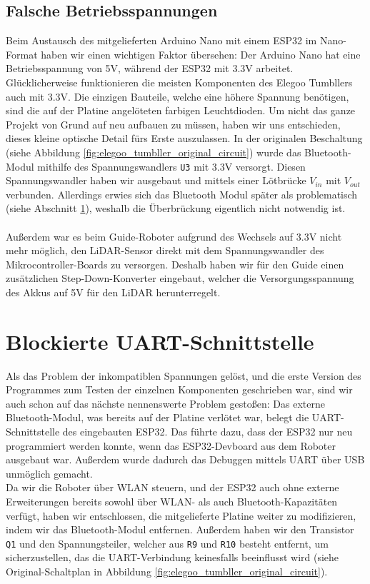 \subsection{Falsche Betriebsspannungen}
\label{subsec:problem_betriebsspannungen}
Beim Austausch des mitgelieferten Arduino Nano mit einem ESP32 im Nano-Format haben wir einen wichtigen Faktor übersehen:
%
Der Arduino Nano hat eine Betriebsspannung von 5V,
während der ESP32 mit 3.3V arbeitet.
%
Glücklicherweise funktionieren die meisten Komponenten des Elegoo Tumbllers auch mit 3.3V.
%
Die einzigen Bauteile,
welche eine höhere Spannung benötigen,
sind die auf der Platine angelöteten farbigen Leuchtdioden.
%
Um nicht das ganze Projekt von Grund auf neu aufbauen zu müssen,
haben wir uns entschieden,
dieses kleine optische Detail fürs Erste auszulassen.
%
In der originalen Beschaltung (siehe Abbildung \ref{fig:elegoo_tumbller_original_circuit})
wurde das Bluetooth-Modul mithilfe des Spannungswandlers \texttt{U3} mit 3.3V versorgt.
%
Diesen Spannungswandler haben wir ausgebaut und mittels einer Lötbrücke $V_{in}$ mit $V_{out}$ verbunden.
Allerdings erwies sich das Bluetooth Modul später als problematisch (siehe Abschnitt \ref{subsec:problem_bluetooth_serial}),
weshalb die Überbrückung eigentlich nicht notwendig ist.
\\\\
Außerdem war es beim Guide-Roboter aufgrund des Wechsels auf 3.3V nicht mehr möglich,
den LiDAR-Sensor direkt mit dem Spannungswandler des Mikrocontroller-Boards zu versorgen.
%
Deshalb haben wir für den Guide einen zusätzlichen Step-Down-Konverter eingebaut,
welcher die Versorgungsspannung des Akkus auf 5V für den LiDAR herunterregelt.
\section{Blockierte UART-Schnittstelle}
\label{subsec:problem_bluetooth_serial}
Als das Problem der inkompatiblen Spannungen gelöst,
und die erste Version des Programmes zum Testen der einzelnen Komponenten geschrieben war,
sind wir auch schon auf das nächste nennenswerte Problem gestoßen:
%
Das externe Bluetooth-Modul,
was bereits auf der Platine verlötet war,
belegt die UART-Schnittstelle des eingebauten ESP32.
%
Das führte dazu, dass der ESP32 nur neu programmiert werden konnte,
wenn das ESP32-Devboard aus dem Roboter ausgebaut war.
%
Außerdem wurde dadurch das Debuggen mittels UART über USB unmöglich gemacht.
\\
Da wir die Roboter über WLAN steuern,
und der ESP32 auch ohne externe Erweiterungen bereits sowohl über WLAN- als auch Bluetooth-Kapazitäten verfügt,
haben wir entschlossen,
die mitgelieferte Platine weiter zu modifizieren,
indem wir das Bluetooth-Modul entfernen.
%
Außerdem haben wir den Transistor \texttt{Q1} und den Spannungsteiler,
welcher aus \texttt{R9} und \texttt{R10} besteht entfernt,
um sicherzustellen, das die UART-Verbindung keinesfalls beeinflusst wird
(siehe Original-Schaltplan in Abbildung \ref{fig:elegoo_tumbller_original_circuit}).
